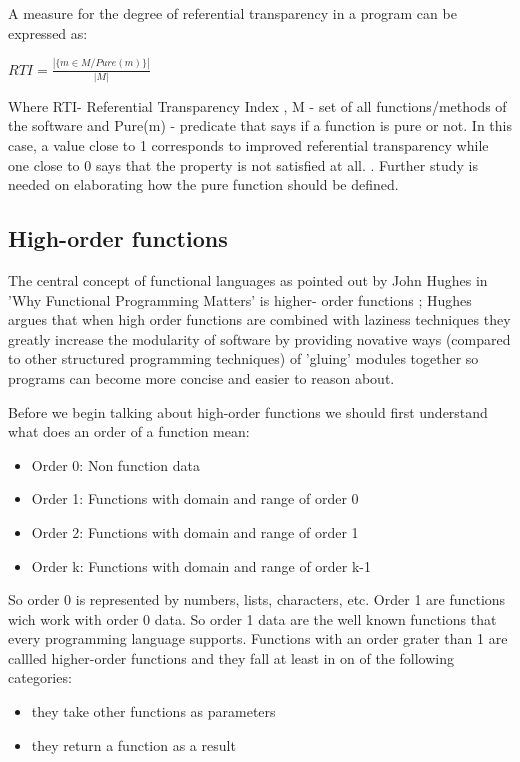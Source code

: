 \documentclass{article}
\begin{document}
A measure for the degree of referential transparency in a program can be expressed as:  \par
\begin{center}
\begin{math}
  RTI = \frac{ | \{ m \in M / Pure(m) \} | } { | M | }
\end{math}
\end{center}

Where RTI- Referential Transparency Index ,  M - set of all functions/methods of the software and  Pure(m) - predicate that says if a function is pure or not. In this case, a value close to 1 corresponds to improved referential transparency while one close to 0 says that the property is not satisfied at all. \cite{DBLP:conf/icse/MudduABP13}. Further study is needed on elaborating how the pure function should be defined. \par

\subsection {High-order functions}
The central concept of functional languages as pointed out by John Hughes \cite{DBLP:journals/cj/Hughes89} in 'Why Functional Programming Matters' is higher- order functions ; Hughes argues that when high order functions are combined with laziness techniques they greatly increase the modularity of software by providing novative ways (compared to other structured programming techniques) of 'gluing' modules together so programs can become more concise and easier to reason about. 

Before we begin talking about high-order functions we should first understand what does an order of a function mean:

\begin{itemize}
\item Order 0: Non function data
\item Order 1: Functions with domain and range of order 0
\item Order 2: Functions with domain and range of order 1
\item Order k: Functions with domain and range of order k-1
\end{itemize}

So order 0 is represented by numbers, lists, characters, etc. Order 1 are functions wich work with order 0 data. So order 1 data are the well known functions that every programming language supports. 
Functions with an order grater than 1 are callled higher-order functions and they fall at least in on of the following categories:
\begin{itemize}
\item they take other functions as parameters
\item they return a function as a result
\end{itemize}
\end{document}
